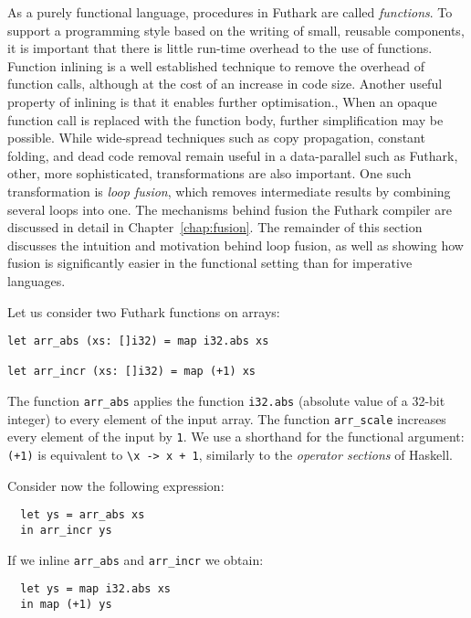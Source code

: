 As a purely functional language, procedures in Futhark are called
\textit{functions}.  To support a programming style based on the
writing of small, reusable components, it is important that there is
little run-time overhead to the use of functions.  Function inlining
is a well established technique to remove the overhead of function
calls, although at the cost of an increase in code size.  Another
useful property of inlining is that it enables further optimisation.,
When an opaque function call is replaced with the function body,
further simplification may be possible.  While wide-spread techniques
such as copy propagation, constant folding, and dead code removal
remain useful in a data-parallel such as Futhark, other, more
sophisticated, transformations are also important.  One such
transformation is \textit{loop fusion}, which removes intermediate
results by combining several loops into one.  The mechanisms behind
fusion the Futhark compiler are discussed in detail in
Chapter~\ref{chap:fusion}. The remainder of this section discusses the
intuition and motivation behind loop fusion, as well as showing how
fusion is significantly easier in the functional setting than for
imperative languages.

Let us consider two Futhark functions on arrays:

\begin{lstlisting}
let arr_abs (xs: []i32) = map i32.abs xs

let arr_incr (xs: []i32) = map (+1) xs
\end{lstlisting}

The function \lstinline{arr_abs} applies the function
\lstinline{i32.abs} (absolute value of a 32-bit integer) to every
element of the input array.  The function \lstinline{arr_scale}
increases every element of the input by \lstinline{1}.  We use a
shorthand for the functional argument: \lstinline{(+1)} is equivalent
to \lstinline{\x -> x + 1}, similarly to the \textit{operator
  sections} of Haskell.

Consider now the following expression:

\begin{lstlisting}
  let ys = arr_abs xs
  in arr_incr ys
\end{lstlisting}

If we inline \lstinline{arr_abs} and \lstinline{arr_incr} we obtain:

\begin{lstlisting}
  let ys = map i32.abs xs
  in map (+1) ys
\end{lstlisting}

